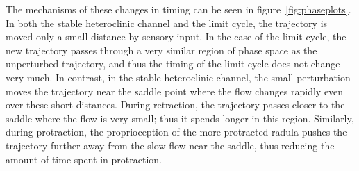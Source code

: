 The mechanisms of these changes in timing can be seen in
figure~\ref{fig:phaseplots}.  In both the stable heteroclinic channel and the limit cycle,
the trajectory is moved only a small distance by sensory input.  In the case of
the limit cycle, the new trajectory passes through a very similar region of phase space
as the unperturbed trajectory, and thus the timing of the limit cycle does not
change very much.  In contrast, in the stable heteroclinic channel, the small perturbation moves the
trajectory near the saddle point where the flow changes rapidly even over these
short distances.  During retraction, the trajectory passes closer to the saddle
where the flow is very small; thus it spends longer in this region.  Similarly,
during protraction, the proprioception of the more protracted radula pushes the
trajectory further away from the slow flow near the saddle, thus reducing the
amount of time spent in protraction.

